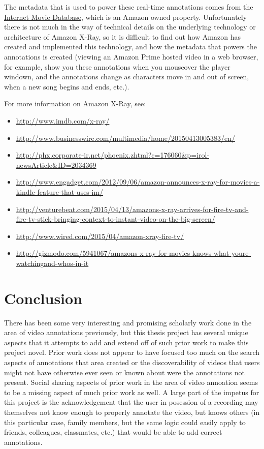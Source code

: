 The metadata that is used to power these real-time annotations comes from the \href{http://www.imdb.com/x-ray/}{Internet Movie Database}, which is an Amazon owned property.  Unfortunately there is not much in the way of technical details on the underlying technology or architecture of Amazon X-Ray, so it is difficult to find out how Amazon has created and implemented this technology, and how the metadata that powers the annotations is created (viewing an Amazon Prime hosted video in a web browser, for example, show you these annotations when you mouseover the player windown, and the annotations change as characters move in and out of screen, when a new song begins and ends, etc.).

For more information on Amazon X-Ray, see:
\begin{itemize}[noitemsep,leftmargin=*]
\item \url{http://www.imdb.com/x-ray/}
\item \url{http://www.businesswire.com/multimedia/home/20150413005383/en/}
\item \url{http://phx.corporate-ir.net/phoenix.zhtml?c=176060&p=irol-newsArticle&ID=2034369}
\item \url{http://www.engadget.com/2012/09/06/amazon-announces-x-ray-for-movies-a-kindle-feature-that-uses-im/}
\item \url{http://venturebeat.com/2015/04/13/amazons-x-ray-arrives-for-fire-tv-and-fire-tv-stick-bringing-context-to-instant-video-on-the-big-screen/}
\item \url{http://www.wired.com/2015/04/amazon-xray-fire-tv/}
\item \url{http://gizmodo.com/5941067/amazons-x-ray-for-movies-knows-what-youre-watchingand-whos-in-it}
\end{itemize}



\section{Conclusion}
\label{sec:priorwork:conclusion}

There has been some very interesting and promising scholarly work done in the area of video annotations previously, but this thesis project has several unique aspects that it attempts to add and extend off of such prior work to make this project novel. Prior work does not appear to have focused too much on the search aspects of annotations that area created or the discoverability of videos that users might not have otherwise ever seen or known about were the annotations not present.  Social sharing aspects of prior work in the area of video annoation seems to be a missing aspect of much prior work as well.  A large part of the impetus for this project is the acknowledgement that the user in posession of a recording may themselves not know enough to properly annotate the video, but knows others (in this particular case, family members, but the same logic could easily apply to friends, colleagues, classmates, etc.) that would be able to add correct annotations.

